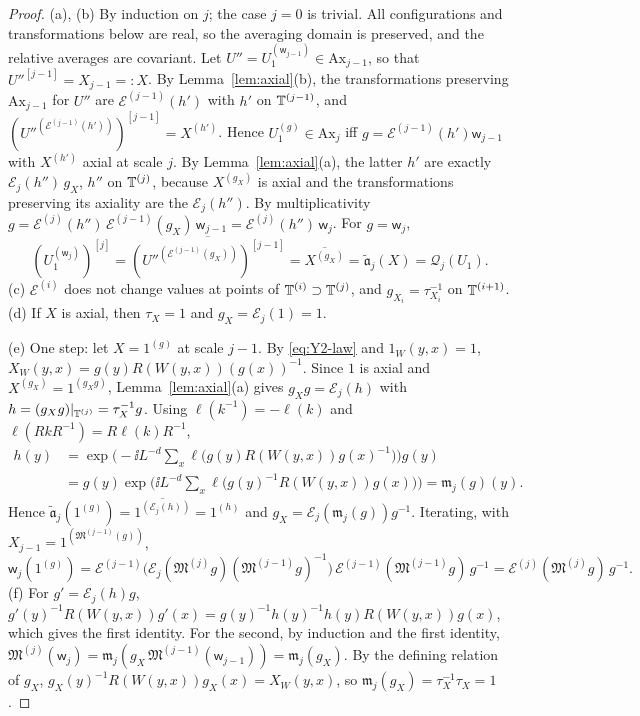 \begin{proof}
(a), (b) By induction on $j$; the case $j=0$ is trivial. All configurations and transformations below are real, so the averaging domain is preserved, and the relative averages are covariant. Let $U''=U_1^{(\mathsf w_{j-1})}\in\mathrm{Ax}_{j-1}$, so that $U''^{[j-1]}=X_{j-1}=:X$. By Lemma~\ref{lem:axial}(b), the transformations preserving $\mathrm{Ax}_{j-1}$ for $U''$ are $\mathcal E^{(j-1)}(h')$ with $h'$ on $\mathbb T^{(j-1)}$, and $(U''^{(\mathcal E^{(j-1)}(h'))})^{[j-1]}=X^{(h')}$. Hence $U_1^{(g)}\in\mathrm{Ax}_j$ iff $g=\mathcal E^{(j-1)}(h')\mathsf w_{j-1}$ with $X^{(h')}$ axial at scale $j$. By Lemma~\ref{lem:axial}(a), the latter $h'$ are exactly $\mathcal E_j(h'')\,g_X$, $h''$ on $\mathbb T^{(j)}$, because $X^{(g_X)}$ is axial and the transformations preserving its axiality are the $\mathcal E_j(h'')$. By multiplicativity $g=\mathcal E^{(j)}(h'')\,\mathcal E^{(j-1)}(g_X)\,\mathsf w_{j-1}=\mathcal E^{(j)}(h'')\,\mathsf w_j$. For $g=\mathsf w_j$,
\[
(U_1^{(\mathsf w_j)})^{[j]}=\overline{(U''^{(\mathcal E^{(j-1)}(g_X))})^{[j-1]}}=\overline{X^{(g_X)}}=\tilde{\mathfrak a}_j(X)=\mathcal Q_j(U_1).
\]
(c) $\mathcal E^{(i)}$ does not change values at points of $\mathbb T^{(i)}\supset\mathbb T^{(j)}$, and $g_{X_i}=\tau_{X_i}^{-1}$ on $\mathbb T^{(i+1)}$. (d) If $X$ is axial, then $\tau_X=1$ and $g_X=\mathcal E_j(1)=1$.

(e) One step: let $X=1^{(g)}$ at scale $j-1$. By \eqref{eq:Y2-law} and $1_W(y,x)=1$, $X_W(y,x)=g(y)R(W(y,x))(g(x))^{-1}$. Since $1$ is axial and $X^{(g_X)}=1^{(g_Xg)}$, Lemma~\ref{lem:axial}(a) gives $g_Xg=\mathcal E_j(h)$ with $h=(g_Xg)|_{\mathbb T^{(j)}}=\tau_X^{-1}g$. Using $\ell(k^{-1})=-\ell(k)$ and $\ell(RkR^{-1})=R\ell(k)R^{-1}$,
\[
\begin{aligned}
h(y)&=\exp\Big(-\ii L^{-d}\sum_x\ell\big(g(y)R(W(y,x))g(x)^{-1}\big)\Big)g(y)\\
&=g(y)\exp\Big(\ii L^{-d}\sum_x\ell\big(g(y)^{-1}R(W(y,x))g(x)\big)\Big)=\mathfrak m_j(g)(y).
\end{aligned}
\]
Hence $\tilde{\mathfrak a}_j(1^{(g)})=\overline{1^{(\mathcal E_j(h))}}=1^{(h)}$ and $g_X=\mathcal E_j(\mathfrak m_j(g))g^{-1}$. Iterating, with $X_{j-1}=1^{(\mathfrak M^{(j-1)}(g))}$,
\[
\mathsf w_j(1^{(g)})=\mathcal E^{(j-1)}\big(\mathcal E_j(\mathfrak M^{(j)}g)(\mathfrak M^{(j-1)}g)^{-1}\big)\,\mathcal E^{(j-1)}(\mathfrak M^{(j-1)}g)\,g^{-1}=\mathcal E^{(j)}(\mathfrak M^{(j)}g)\,g^{-1}.
\]
(f) For $g'=\mathcal E_j(h)g$, $g'(y)^{-1}R(W(y,x))g'(x)=g(y)^{-1}h(y)^{-1}h(y)R(W(y,x))g(x)$, which gives the first identity. For the second, by induction and the first identity, $\mathfrak M^{(j)}(\mathsf w_j)=\mathfrak m_j(g_X\,\mathfrak M^{(j-1)}(\mathsf w_{j-1}))=\mathfrak m_j(g_X)$. By the defining relation of $g_X$, $g_X(y)^{-1}R(W(y,x))g_X(x)=X_W(y,x)$, so $\mathfrak m_j(g_X)=\tau_X^{-1}\tau_X=1$.
\end{proof}


